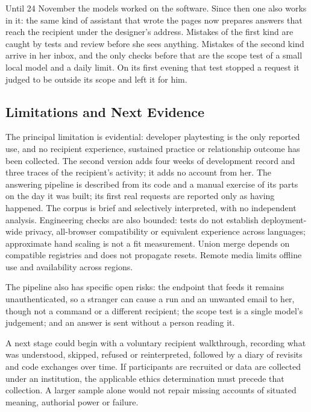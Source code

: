 \documentclass[sigconf,nonacm]{acmart}
\begin{document}
Until 24 November the models worked on the software. Since then one also works in it: the same
kind of assistant that wrote the pages now prepares answers that reach the recipient under the
designer's address. Mistakes of the first kind are caught by tests and review before she sees
anything. Mistakes of the second kind arrive in her inbox, and the only checks before that are
the scope test of a small local model and a daily limit. On its first evening that test stopped a request it judged to be outside its scope and left it
for him.

\subsection{Limitations and Next Evidence}
The principal limitation is evidential: developer playtesting is the only reported use, and no
recipient experience, sustained practice or relationship outcome has been collected. The second
version adds four weeks of development record and three traces of the recipient's activity; it
adds no account from her. The answering pipeline is described from its code and a manual exercise
of its parts on the day it was built; its first real requests are reported only as having
happened. The corpus
is brief and selectively interpreted, with no independent analysis. Engineering checks are also
bounded: tests do not establish deployment-wide privacy, all-browser compatibility or equivalent
experience across languages; approximate hand scaling is not a fit measurement. Union merge
depends on compatible registries and does not propagate resets. Remote media limits offline use
and availability across regions.

The pipeline also has specific open risks: the endpoint that feeds it remains unauthenticated,
so a stranger can cause a run and an unwanted email to her, though not a command or a different
recipient; the scope test is a single model's judgement; and an answer is sent without a person
reading it.

A next stage could begin with a voluntary recipient walkthrough, recording what was understood,
skipped, refused or reinterpreted, followed by a diary of revisits and code exchanges over time.
If participants are recruited or data are collected
under an institution, the applicable ethics determination must precede that collection. A larger
sample alone would not repair missing accounts of situated meaning, authorial power or failure.

\end{document}
